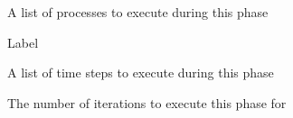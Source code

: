 
 {A list of processes to execute during this phase}

 {Label}

 {A list of time steps to execute during this phase}

 {The number of iterations to execute this phase for}

